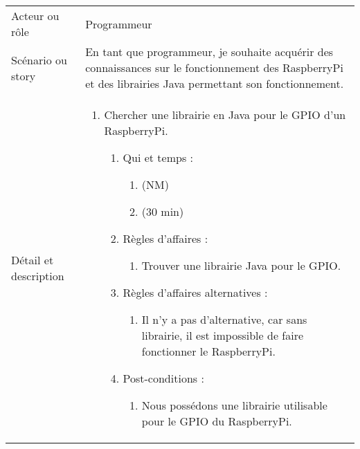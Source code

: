 \begin{longtable}{|l|p{}|}
\hline
    \rowcolor{Gray}
    \multicolumn{2}{|l|}{5} \\
\hline
    Acteur ou rôle & Programmeur \\
\hline
    Scénario ou story & En tant que programmeur, je
    souhaite acquérir des connaissances sur le fonctionnement des RaspberryPi et des librairies Java permettant son fonctionnement. \\
\hline
    Détail et description &
        \begin{enumerate}[label*=\arabic*.]
            \item Chercher une librairie en Java pour le GPIO d'un RaspberryPi.
                \begin{enumerate}[label*=\arabic*.]
                                \item Qui et temps :
                                \begin{enumerate}[label*=\arabic*.]
                                    \item (NM)
                                    \item (30 min)
                                \end{enumerate}
                                \item Règles d'affaires :
                                \begin{enumerate}[label*=\arabic*.]
                                    \item Trouver une librairie Java pour le GPIO.
                                \end{enumerate}
                                \item Règles d'affaires alternatives :
                                \begin{enumerate}[label*=\arabic*.]
                                    \item Il n'y a pas d'alternative, car sans librairie, il est impossible de faire fonctionner le RaspberryPi.
                                \end{enumerate}
                                \item Post-conditions :
                                \begin{enumerate}[label*=\arabic*.]
                                    \item Nous possédons une librairie utilisable pour le GPIO du RaspberryPi.
                                \end{enumerate}
                            \end{enumerate}

\end{enumerate}
\end{longtable}
